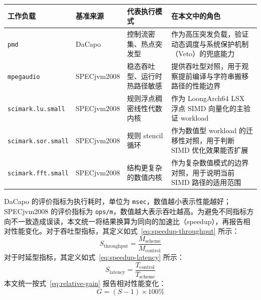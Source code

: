 \begingroup
    \centering
    \begin{minipage}{\textwidth}
        \centering
        \footnotesize
        \setlength{\tabcolsep}{3pt}
        \renewcommand{\arraystretch}{0.92}
        \label{tab:formal-workload-selection}
        \begin{tabular}{>{\raggedright\arraybackslash}p{2.7cm}>{\raggedright\arraybackslash}p{2.1cm}>{\raggedright\arraybackslash}p{3.0cm}>{\raggedright\arraybackslash}p{5.0cm}}
            \toprule
            \textbf{工作负载} & \textbf{基准来源} & \textbf{代表执行模式} & \textbf{在本文中的角色} \\
            \midrule
            \texttt{pmd} & DaCapo & 控制流密集、热点突发型 & 作为高压突发负载，验证动态调度与系统保护机制（Veto）的兜底能力 \\
            \texttt{mpegaudio} & SPECjvm2008 & 稳态吞吐型、运行时热路径敏感 & 提供吞吐型对照，用于观察提前编译与字符串搬移路径的性能边界 \\
            \texttt{scimark.lu.small} & SPECjvm2008 & 规则浮点稠密线性代数内核 & 作为 LoongArch64 LSX 浮点 SIMD 向量化的主验证 workload \\
            \texttt{scimark.sor.small} & SPECjvm2008 & 规则 stencil 循环 & 作为数值型 workload 的迁移性对照，用于判断 SIMD 优化效果能否扩展 \\
            \texttt{scimark.fft.small} & SPECjvm2008 & 结构更复杂的数值内核 & 作为复杂数值模式的边界对照，用于说明当前 SIMD 路径的适用范围 \\
            \bottomrule
        \end{tabular}
    \end{minipage}
    \par
\endgroup

DaCapo 的评价指标为执行耗时，单位为 \texttt{msec}，数值越小表示性能越好；SPECjvm2008 的评价指标为 \texttt{ops/m}，数值越大表示吞吐越高。为避免不同指标方向不一致造成误读，本文统一将结果换算为同向的加速比（speedup），再报告相对性能变化。对于吞吐型指标，其定义如式~\ref{eq:speedup-throughput} 所示：
\begin{equation}
    \label{eq:speedup-throughput}
    S_{\text{throughput}} = \frac{M_{\text{scheme}}}{M_{\text{control}}}
\end{equation}
对于时延型指标，其定义如式~\ref{eq:speedup-latency} 所示：
\begin{equation}
    \label{eq:speedup-latency}
    S_{\text{latency}} = \frac{T_{\text{control}}}{T_{\text{scheme}}}
\end{equation}
本文统一按式~\ref{eq:relative-gain} 报告相对性能变化：
\begin{equation}
    \label{eq:relative-gain}
    G = (S - 1)\times 100\%
\end{equation}

